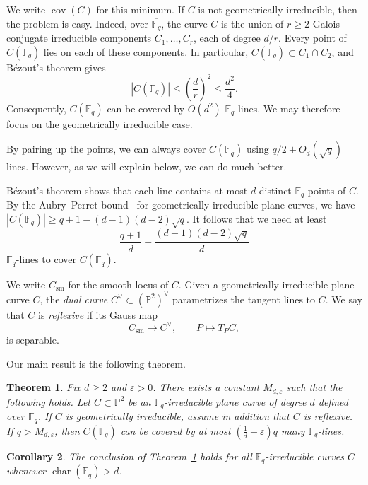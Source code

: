 \documentclass[10pt,a4paper]{amsart}
\newtheorem{theorem}{Theorem}[section]
\newtheorem{corollary}[theorem]{Corollary}
\theoremstyle{definition}
\theoremstyle{remark}
\newcommand{\Fq}{\mathbb{F}_q}
\newcommand{\bP}{\mathbb{P}}
\begin{document}
We write $\operatorname{cov}(C)$ for this minimum. If $C$ is not geometrically irreducible, then the problem is easy. Indeed, over $\overline{\Fq}$, the curve $C$ is the union of $r\geq 2$ Galois-conjugate irreducible components $C_1,\ldots,C_r$, each of degree $d/r$. Every point of $C(\Fq)$ lies on each of these components. In particular, $C(\Fq)\subset C_1\cap C_2$, and B\'ezout's theorem gives
\[
|C(\Fq)|\leq \left(\frac{d}{r}\right)^2\leq \frac{d^2}{4}.
\]
Consequently, $C(\Fq)$ can be covered by $O(d^2)$ $\Fq$-lines. We may therefore focus on the geometrically irreducible case.

By pairing up the points, we can always cover $C(\Fq)$ using $q/2+O_d(\sqrt{q})$ lines. However, as we will explain below, we can do much better.

B\'ezout's theorem shows that each line contains at most $d$ distinct $\Fq$-points of $C$. By the Aubry--Perret bound~\cite{AP96} for geometrically irreducible plane curves, we have $|C(\Fq)|\geq q+1-(d-1)(d-2)\sqrt q$. It follows that we need at least
\begin{equation}\label{eq:lower-bound}
\frac{q+1}{d} - \frac{(d-1)(d-2)\sqrt{q}}{d}
\end{equation}
$\Fq$-lines to cover $C(\Fq)$.

We write $C_{\mathrm{sm}}$ for the smooth locus of $C$. Given a geometrically irreducible plane curve $C$, the \emph{dual curve} $C^\vee\subset(\bP^2)^\vee$ parametrizes the tangent lines to $C$. We say that $C$ is \emph{reflexive} if its Gauss map
\[
C_{\mathrm{sm}}\longrightarrow C^\vee,
\qquad
P\longmapsto T_PC,
\]
is separable. 

Our main result is the following theorem.


\begin{theorem}\label{thm:main}
Fix $d\geq 2$ and $\varepsilon>0$. There exists a constant $M_{d,\varepsilon}$ such that the following holds. Let $C\subset\bP^2$ be an $\Fq$-irreducible plane curve of degree $d$ defined over $\Fq$. If $C$ is geometrically irreducible, assume in addition that $C$ is reflexive. If $q>M_{d,\varepsilon}$, then $C(\Fq)$ can be covered by at most $\left(\frac{1}{d}+\varepsilon\right)q$ many $\Fq$-lines.
\end{theorem}


\begin{corollary}\label{cor:large-characteristic}
The conclusion of Theorem~\ref{thm:main} holds for all $\Fq$-irreducible curves $C$ whenever $\operatorname{char}(\Fq)>d$.
\end{corollary}
\end{document}
